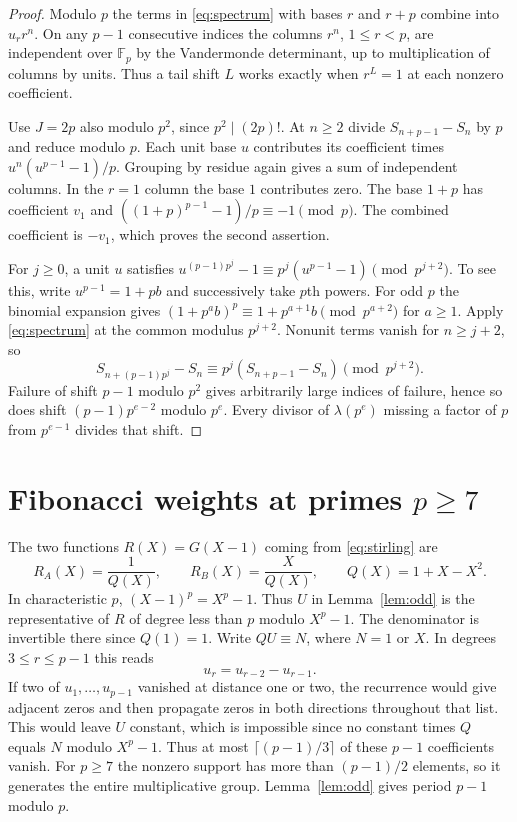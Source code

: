 \documentclass[11pt,letterpaper]{article}
\newcommand{\FF}{\mathbb F}
\begin{document}
\begin{proof}
Modulo $p$ the terms in \eqref{eq:spectrum} with bases $r$ and $r+p$
combine into $u_rr^n$. On any $p-1$ consecutive indices the columns
$r^n$, $1\le r<p$, are independent over $\FF_p$ by the Vandermonde
determinant, up to multiplication of columns by units. Thus a tail shift
$L$ works exactly when $r^L=1$ at each nonzero coefficient.

Use $J=2p$ also modulo $p^2$, since $p^2\mid(2p)!$. At $n\ge2$ divide
$S_{n+p-1}-S_n$ by $p$ and reduce modulo $p$. Each unit base $u$
contributes its coefficient times $u^n(u^{p-1}-1)/p$. Grouping by residue
again gives a sum of independent columns. In the $r=1$ column the base
$1$ contributes zero. The base $1+p$ has coefficient $v_1$ and
$((1+p)^{p-1}-1)/p\equiv-1\pmod p$. The combined coefficient is $-v_1$,
which proves the second assertion.

For $j\ge0$, a unit $u$ satisfies
$u^{(p-1)p^j}-1\equiv p^j(u^{p-1}-1)\pmod{p^{j+2}}$.
To see this, write $u^{p-1}=1+pb$ and successively take $p$th powers.
For odd $p$ the binomial expansion gives $(1+p^a b)^p\equiv1+p^{a+1}b\pmod{p^{a+2}}$
for $a\ge1$. Apply \eqref{eq:spectrum} at the common modulus $p^{j+2}$.
Nonunit terms vanish for $n\ge j+2$, so
\begin{equation}\label{eq:oddlift}
 S_{n+(p-1)p^j}-S_n\equiv p^j(S_{n+p-1}-S_n)\pmod{p^{j+2}}.
\end{equation}
Failure of shift $p-1$ modulo $p^2$ gives arbitrarily large indices of
failure, hence so does shift $(p-1)p^{e-2}$ modulo $p^e$. Every divisor of
$\lambda(p^e)$ missing a factor of $p$ from $p^{e-1}$ divides that shift.
\end{proof}

\clearpage
\section{Fibonacci weights at primes \texorpdfstring{$p\ge7$}{p at least 7}}

The two functions $R(X)=G(X-1)$ coming from \eqref{eq:stirling} are
\[
 R_A(X)=\frac{1}{Q(X)},\qquad
 R_B(X)=\frac{X}{Q(X)},\qquad Q(X)=1+X-X^2.
\]
In characteristic $p$, $(X-1)^p=X^p-1$. Thus $U$ in Lemma~\ref{lem:odd}
is the representative of $R$ of degree less than $p$ modulo $X^p-1$.
The denominator is invertible there since $Q(1)=1$. Write $Q U\equiv N$,
where $N=1$ or $X$. In degrees $3\le r\le p-1$ this reads
\[
 u_r=u_{r-2}-u_{r-1}.
\]
If two of $u_1,\ldots,u_{p-1}$ vanished at distance one or two, the recurrence
would give adjacent zeros and then propagate zeros in both directions
throughout that list. This would leave $U$ constant, which is impossible
since no constant times $Q$ equals $N$ modulo $X^p-1$. Thus at most
$\lceil(p-1)/3\rceil$ of these $p-1$ coefficients vanish. For $p\ge7$ the
nonzero support has more than $(p-1)/2$ elements, so it generates the entire
multiplicative group. Lemma~\ref{lem:odd} gives period $p-1$ modulo $p$.
\end{document}
